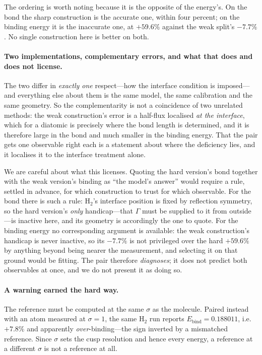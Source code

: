 \documentclass[11pt,a4paper]{article}
\begin{document}
The ordering is worth noting because it is the opposite of the energy's. On the bond the sharp
construction is the accurate one, within four percent; on the binding energy it is the inaccurate
one, at $+59.6\%$ against the weak split's $-7.7\%$. No single construction here is better on both.

\paragraph{Two implementations, complementary errors, and what that does and does not license.} The
two differ in \emph{exactly one} respect---how the interface condition is imposed---and everything
else about them is the same model, the same calibration and the same geometry. So the
complementarity is not a coincidence of two unrelated methods: the weak construction's error is a
half-flux localised \emph{at the interface}, which for a diatomic is precisely where the bond length
is determined, and it is therefore large in the bond and much smaller in the binding energy. That
the pair gets one observable right each is a statement about where the deficiency lies, and it
localises it to the interface treatment alone.

We are careful about what this licenses. Quoting the hard version's bond together with the weak version's binding as
``the model's answer'' would require a rule, settled in advance, for which construction to trust for
which observable. For the bond there is such a rule: H$_2$'s interface position is fixed by
reflection symmetry, so the hard version's \emph{only} handicap---that $\Gamma$ must be
supplied to it from outside---is inactive here, and its geometry is accordingly the one to quote.
For the binding energy no corresponding argument is available: the weak construction's handicap is
never inactive, so its $-7.7\%$ is not privileged over the hard $+59.6\%$ by anything beyond being
nearer the measurement, and selecting it on that ground would be fitting. The pair therefore
\emph{diagnoses}; it does not predict both observables at once, and we do not present it as doing
so.

\paragraph{A warning earned the hard way.} The reference must be computed at the same $\sigma$ as
the molecule. Paired instead with an atom measured at $\sigma = 1$, the same H$_2$ run reports
$E_{\text{bind}} = 0.188011$, i.e.\ $+7.8\%$ and apparently \emph{over}-binding---the sign inverted
by a mismatched reference. Since $\sigma$ sets the cusp resolution and hence every energy, a
reference at a different $\sigma$ is not a reference at all.
\end{document}
